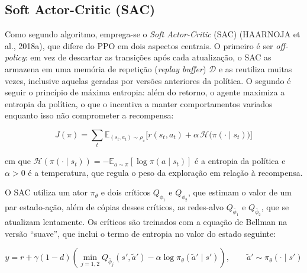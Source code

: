 
\subsection{Soft Actor-Critic (SAC)}

Como segundo algoritmo, emprega-se o \textit{Soft Actor-Critic} (SAC) (HAARNOJA et al., 2018a), que difere do PPO em dois aspectos centrais. O primeiro é ser \textit{off-policy}: em vez de descartar as transições após cada atualização, o SAC as armazena em uma memória de repetição (\textit{replay buffer}) $\mathcal{D}$ e as reutiliza muitas vezes, inclusive aquelas geradas por versões anteriores da política. O segundo é seguir o princípio de máxima entropia: além do retorno, o agente maximiza a entropia da política, o que o incentiva a manter comportamentos variados enquanto isso não comprometer a recompensa:

\begin{equation}
    J(\pi) = \sum_{t} \mathbb{E}_{(s_t, a_t) \sim \rho_\pi} \Big[ r(s_t, a_t) + \alpha \, \mathcal{H}\big(\pi(\cdot \mid s_t)\big) \Big]
    \label{eq:sac_objetivo}
\end{equation}

\noindent em que $\mathcal{H}(\pi(\cdot \mid s_t)) = -\mathbb{E}_{a \sim \pi}[\log \pi(a \mid s_t)]$ é a entropia da política e $\alpha > 0$ é a temperatura, que regula o peso da exploração em relação à recompensa.

O SAC utiliza um ator $\pi_\theta$ e dois críticos $Q_{\phi_1}$ e $Q_{\phi_2}$, que estimam o valor de um par estado-ação, além de cópias desses críticos, as redes-alvo $Q_{\bar{\phi}_1}$ e $Q_{\bar{\phi}_2}$, que se atualizam lentamente. Os críticos são treinados com a equação de Bellman na versão ``suave'', que inclui o termo de entropia no valor do estado seguinte:

\begin{equation}
    y = r + \gamma (1 - d) \left( \min_{j=1,2} Q_{\bar{\phi}_j}(s', \tilde{a}') - \alpha \log \pi_\theta(\tilde{a}' \mid s') \right), \qquad \tilde{a}' \sim \pi_\theta(\cdot \mid s')
    \label{eq:sac_alvo}
\end{equation}

